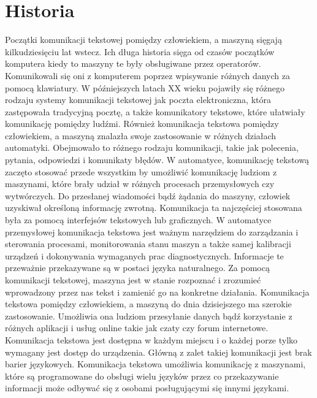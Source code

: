 \section{Historia}
Początki komunikacji tekstowej pomiędzy człowiekiem, a maszyną sięgają kilkudziesięciu lat wstecz. Ich długa historia sięga od czasów początków komputera kiedy to maszyny te były obsługiwane przez operatorów. Komunikowali się oni z komputerem poprzez wpisywanie różnych danych za pomocą klawiatury. W późniejszych latach XX wieku pojawiły się różnego rodzaju systemy komunikacji tekstowej jak poczta elektroniczna, która zastępowała tradycyjną pocztę, a także komunikatory tekstowe, które ułatwiały komunikację pomiędzy ludźmi. Również komunikacja tekstowa pomiędzy człowiekiem, a maszyną znalazła swoje zastosowanie w różnych działach automatyki. Obejmowało to różnego rodzaju komunikacji, takie jak polecenia, pytania, odpowiedzi i komunikaty błędów. W automatyce, komunikację tekstową zaczęto stosować przede wszystkim by umożliwić komunikację ludziom z maszynami, które brały udział w różnych procesach przemysłowych czy wytwórczych. Do przesłanej wiadomości bądź żądania do maszyny, człowiek uzyskiwał określoną informację zwrotną. Komunikacja ta najczęściej stosowana była za pomocą interfejsów tekstowych lub graficznych. W automatyce przemysłowej komunikacja tekstowa jest ważnym narzędziem do zarządzania i sterowania procesami, monitorowania stanu maszyn a także samej kalibracji urządzeń i dokonywania wymaganych prac diagnostycznych. Informacje te przeważnie przekazywane są w postaci języka naturalnego. Za pomocą komunikacji tekstowej, maszyna jest w stanie rozpoznać i zrozumieć wprowadzony przez nas tekst i zamienić go na konkretne działania. Komunikacja tekstowa pomiędzy człowiekiem, a maszyną do dnia dzisiejszego ma szerokie zastosowanie. Umożliwia ona ludziom przesyłanie danych bądź korzystanie z różnych aplikacji i usług online takie jak czaty czy forum internetowe. Komunikacja tekstowa jest dostępna w każdym miejscu i o każdej porze tylko wymagany jest dostęp do urządzenia. Główną z zalet takiej komunikacji jest brak barier językowych. Komunikacja tekstowa umożliwia komunikację z maszynami, które są programowane do obsługi wielu języków przez co przekazywanie informacji może odbywać się z osobami posługującymi się innymi językami.
